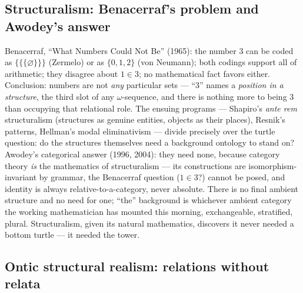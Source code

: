 \documentclass[11pt]{article}
\theoremstyle{plain}
\theoremstyle{definition}
\theoremstyle{remark}
\begin{document}
\subsection{Structuralism: Benacerraf's problem and Awodey's answer}\label{sec:structuralism}

Benacerraf, ``What Numbers Could Not Be'' (1965): the number 3 can be coded as $\{\{\{\varnothing\}\}\}$ (Zermelo) or as $\{0,1,2\}$ (von Neumann); both codings support all of arithmetic; they disagree about $1 \in 3$; no mathematical fact favors either. Conclusion: numbers are not \emph{any} particular sets --- ``3'' names a \emph{position in a structure}, the third slot of any $\omega$-sequence, and there is nothing more to being 3 than occupying that relational role. The ensuing programs --- Shapiro's \emph{ante rem} structuralism (structures as genuine entities, objects as their places), Resnik's patterns, Hellman's modal eliminativism --- divide precisely over the turtle question: do the structures themselves need a background ontology to stand on? Awodey's categorical answer (1996, 2004): they need none, because category theory \emph{is} the mathematics of structuralism --- its constructions are isomorphism-invariant by grammar, the Benacerraf question ($1 \in 3$?) cannot be posed, and identity is always relative-to-a-category, never absolute. There is no final ambient structure and no need for one; ``the'' background is whichever ambient category the working mathematician has mounted this morning, exchangeable, stratified, plural. Structuralism, given its natural mathematics, discovers it never needed a bottom turtle --- it needed the tower.

\subsection{Ontic structural realism: relations without relata}\label{sec:osr}
\end{document}
